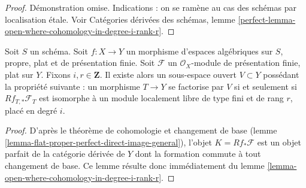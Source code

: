 \begin{proof}
D\'emonstration omise. Indications :
on se ram\`ene au cas des sch\'emas par localisation \'etale. Voir Cat\'egories
d\'eriv\'ees des sch\'emas, lemme
\ref{perfect-lemma-open-where-cohomology-in-degree-i-rank-r}.
\end{proof}

\begin{lemma}
\label{lemma-open-where-cohomology-in-degree-i-rank-r-geometric}
Soit $S$ un sch\'ema.
Soit $f:X\to Y$ un morphisme d'espaces alg\'ebriques sur $S$, propre, plat et
de pr\'esentation finie.
Soit $\mathcal{F}$ un $\mathcal{O}_X$-module de pr\'esentation finie, plat sur
$Y$. Fixons $i,r\in\mathbf{Z}$.
Il existe alors un sous-espace ouvert $V\subset Y$ poss\'edant la propri\'et\'e
suivante : un morphisme $T\to Y$ se factorise par $V$ si et seulement si
$Rf_{T,*}\mathcal{F}_T$ est isomorphe \`a un module localement libre de type
fini et de rang $r$, plac\'e en degr\'e $i$.
\end{lemma}

\begin{proof}
D'apr\`es le th\'eor\`eme de cohomologie et changement de base
(lemme \ref{lemma-flat-proper-perfect-direct-image-general}), l'objet
$K=Rf_*\mathcal{F}$ est un objet parfait de la cat\'egorie d\'eriv\'ee de $Y$
dont la formation commute \`a tout changement de base. Ce lemme r\'esulte donc
imm\'ediatement du lemme
\ref{lemma-open-where-cohomology-in-degree-i-rank-r}.
\end{proof}

